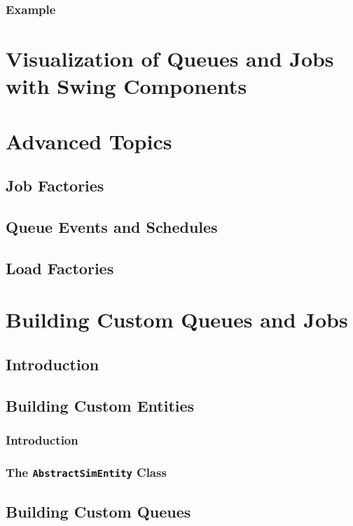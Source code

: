 \documentclass[12pt]{book}
\begin{document}
\subsection{Example}

\chapter{Visualization of Queues and Jobs with Swing Components}

\chapter{Advanced Topics}

\section{Job Factories}

\section{Queue Events and Schedules}

\section{Load Factories}

\chapter{Building Custom Queues and Jobs}

\section{Introduction}

\section{Building Custom Entities}

\subsection{Introduction}

\subsection{The \lstinline{AbstractSimEntity} Class}

\section{Building Custom Queues}
\end{document}
